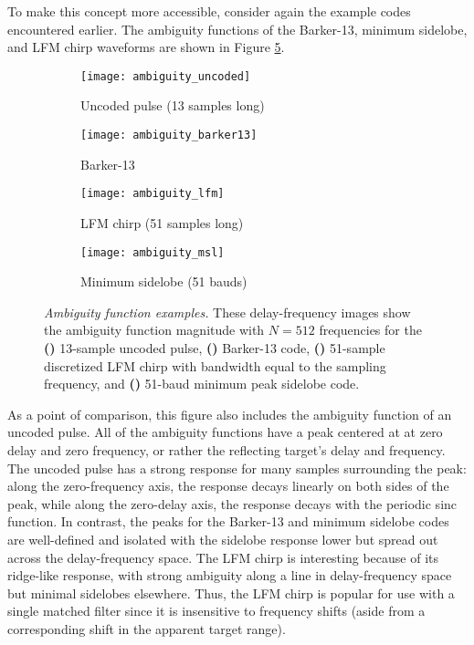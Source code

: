 To make this concept more accessible, consider again the example codes encountered earlier. The ambiguity functions of the Barker-13, minimum sidelobe, and LFM chirp waveforms are shown in Figure \ref{fig:ambiguity_functions}.
\begin{figure}[tpb]
 \centering
 \begin{subfigure}{0.5\textwidth}
  \centering
  \texttt{[image: ambiguity\_uncoded]}
  \caption{Uncoded pulse (13 samples long)}
  \label{fig:uncoded_ambiguity}
 \end{subfigure}%
 \begin{subfigure}{0.5\textwidth}
  \centering
  \texttt{[image: ambiguity\_barker13]}
  \caption{Barker-13}
  \label{fig:barker13_ambiguity}
 \end{subfigure}
 
 \vspace{\baselineskip}
 \begin{subfigure}{0.5\textwidth}
  \centering
  \texttt{[image: ambiguity\_lfm]}
  \caption{LFM chirp (51 samples long)}
  \label{fig:lfm_ambiguity}
 \end{subfigure}%
 \begin{subfigure}{0.5\textwidth}
  \centering
  \texttt{[image: ambiguity\_msl]}
  \caption{Minimum sidelobe (51 bauds)}
  \label{fig:msl_ambiguity}
 \end{subfigure}
 \caption[Ambiguity function examples]{\emph{Ambiguity function examples.} These delay-frequency images show the ambiguity function magnitude with $N=512$ frequencies for the \textbf{()} 13-sample uncoded pulse, \textbf{()} Barker-13 code, \textbf{()} 51-sample discretized LFM chirp with bandwidth equal to the sampling frequency, and \textbf{()} 51-baud minimum peak sidelobe code.}
 \label{fig:ambiguity_functions}
\end{figure}%
As a point of comparison, this figure also includes the ambiguity function of an uncoded pulse. All of the ambiguity functions have a peak centered at at zero delay and zero frequency, or rather the reflecting target's delay and frequency. The uncoded pulse has a strong response for many samples surrounding the peak: along the zero-frequency axis, the response decays linearly on both sides of the peak, while along the zero-delay axis, the response decays with the periodic sinc function. In contrast, the peaks for the Barker-13 and minimum sidelobe codes are well-defined and isolated with the sidelobe response lower but spread out across the delay-frequency space. The LFM chirp is interesting because of its ridge-like response, with strong ambiguity along a line in delay-frequency space but minimal sidelobes elsewhere. Thus, the LFM chirp is popular for use with a single matched filter since it is insensitive to frequency shifts (aside from a corresponding shift in the apparent target range).

